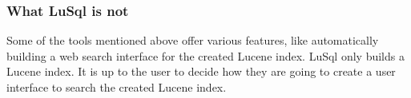 \subsubsection{What LuSql is not}
Some of the tools mentioned above offer various features, like automatically
building a web search interface for the created Lucene index.
LuSql only builds a Lucene index.
It is up to the user to decide how they are going to create a user interface
to search the created Lucene index. 
